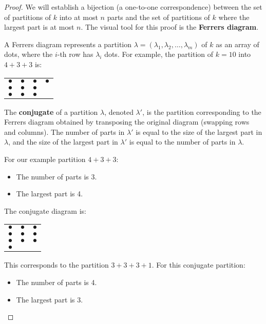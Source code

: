 \documentclass{article}
\theoremstyle{definition}
\begin{document}
\begin{proof}
  We will establish a bijection (a one-to-one correspondence) between the set of partitions of $k$ into at most $n$ parts and the set of partitions of $k$ where the largest part is at most $n$. The visual tool for this proof is the \textbf{Ferrers diagram}.

  A Ferrers diagram represents a partition $\lambda = (\lambda_1, \lambda_2, \dots, \lambda_m)$ of $k$ as an array of dots, where the $i$-th row has $\lambda_i$ dots. For example, the partition of $k=10$ into $4+3+3$ is:
  \begin{center}
    \begin{tabular}{cccc}
      $\bullet$ & $\bullet$ & $\bullet$ & $\bullet$ \\
      $\bullet$ & $\bullet$ & $\bullet$ & \\
      $\bullet$ & $\bullet$ & $\bullet$ & \\
    \end{tabular}
  \end{center}
  
  The \textbf{conjugate} of a partition $\lambda$, denoted $\lambda'$, is the partition corresponding to the Ferrers diagram obtained by transposing the original diagram (swapping rows and columns). The number of parts in $\lambda'$ is equal to the size of the largest part in $\lambda$, and the size of the largest part in $\lambda'$ is equal to the number of parts in $\lambda$.

  For our example partition $4+3+3$:
  \begin{itemize}
    \item The number of parts is 3.
    \item The largest part is 4.
  \end{itemize}
  The conjugate diagram is:
  \begin{center}
    \begin{tabular}{ccc}
      $\bullet$ & $\bullet$ & $\bullet$ \\
      $\bullet$ & $\bullet$ & $\bullet$ \\
      $\bullet$ & $\bullet$ & $\bullet$ \\
      $\bullet$ & & \\
    \end{tabular}
  \end{center}
  This corresponds to the partition $3+3+3+1$. For this conjugate partition:
  \begin{itemize}
    \item The number of parts is 4.
    \item The largest part is 3.
  \end{itemize}
  

\end{proof}
\end{document}
